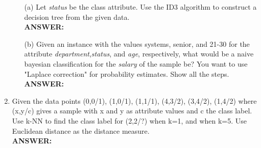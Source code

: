 \documentclass{article}
\begin{document}
\begin{enumerate}
\begin{enumerate}
\item[(a)] Let {\it status} be the class attribute. Use the ID3
  algorithm to construct a decision tree from the given data.\\
\textbf{ANSWER:}

\item[(b)] Given an instance with the values systems, senior, and
  21-30 for the attribute {\it department},{\it status}, and
  {\it age}, respectively, what would be a naive bayesian
  classification for the {\it salary} of the sample be? You want to
  use "Laplace correction" for probability estimates. Show all the
  steps. \\
\textbf{ANSWER:}
\end{enumerate} %

\item Given the data points (0,0/1), (1,0/1), (1,1/1), (4,3/2),
  (3,4/2), (1,4/2) where (x,y/c) gives a sample with x and y as
  attribute values and c the class label. Use k-NN to find the class
  label for (2,2/?) when k=1, and when k=5. Use Euclidean distance as
  the distance measure. \\ 
\textbf{ANSWER:}

\end{enumerate} %
\end{document}
